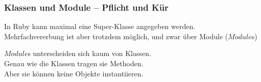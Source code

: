 \documentclass{beamer}
\begin{document}
\lstset{language=Ruby}
\lstset{basicstyle=\small,numbers=none, numberstyle=\tiny, numbersep=5pt, showstringspaces=false}

\begin{frame}
  \frametitle{Klassen und Module -- Pflicht und Kür}
  In Ruby kann maximal eine Super-Klasse angegeben werden. \pause \\
  Mehrfachvererbung ist aber trotzdem möglich, 
  und zwar über Module ($Module$s)  \\
  \pause
  
  \medskip
  $Module$s unterscheiden sich kaum von Klassen. \\
  Genau wie die Klassen tragen sie Methoden. \\
  Aber sie können keine Objekte instantiieren.
  
\end{frame}
\end{document}

